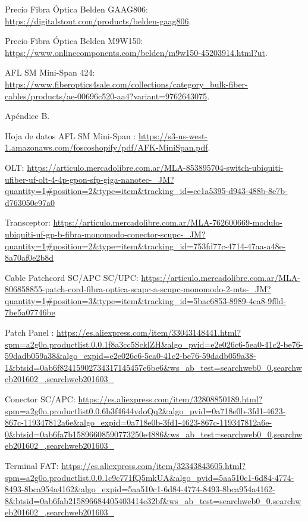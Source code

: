 \begin{thebibliography}{99}
 Precio Fibra Óptica Belden GAAG806: {\tiny \url{https://digitalstout.com/products/belden-gaag806}}.

 Precio Fibra Óptica Belden M9W150: {\tiny \url{https://www.onlinecomponents.com/belden/m9w150-45203914.html?ut}}.

 AFL SM Mini-Span 424: {\tiny \url{https://www.fiberoptics4sale.com/collections/category_bulk-fiber-cables/products/ae-00696c520-aa4?variant=9762643075}}.

 Apéndice B.

 Hoja de datos AFL SM Mini-Span : {\tiny \url{https://s3-us-west-1.amazonaws.com/foscoshopify/pdf/AFK-MiniSpan.pdf}}.

 OLT: {\tiny \url{https://articulo.mercadolibre.com.ar/MLA-853895704-switch-ubiquiti-ufiber-uf-olt-4-4p-gpon-sfp-giga-nanotec-_JM?quantity=1#position=2&type=item&tracking_id=ce1a5395-d943-488b-8e7b-d763050e97a0}}

 Transceptor: {\tiny \url{https://articulo.mercadolibre.com.ar/MLA-762600669-modulo-ubiquiti-uf-gp-b-fibra-monomodo-conector-scupc-_JM?quantity=1#position=2&type=item&tracking_id=753fd77c-4714-47aa-a48e-8a70af0e2b8d}}

 Cable Patchcord SC/APC SC/UPC: {\tiny \url{https://articulo.mercadolibre.com.ar/MLA-806858855-patch-cord-fibra-optica-scapc-a-scupc-monomodo-2-mts-_JM?quantity=1#position=3&type=item&tracking_id=5bac6853-8989-4ea8-9f0d-7be5a07746be}}

 Patch Panel : {\tiny \url{https://es.aliexpress.com/item/33043148441.html?spm=a2g0o.productlist.0.0.1f8a3cc5ScklZH&algo_pvid=e2e026c6-5ea0-41c2-be76-59dadb059a38&algo_expid=e2e026c6-5ea0-41c2-be76-59dadb059a38-1&btsid=0ab6f82415902734317145457e6be6&ws_ab_test=searchweb0_0,searchweb201602_,searchweb201603_}}

 Conector SC/APC: {\tiny \url{https://es.aliexpress.com/item/32808850189.html?spm=a2g0o.productlist0.0.6b3f4644vdoQq2&algo_pvid=0a718e0b-3fd1-4623-867c-119347812a6e&algo_expid=0a718e0b-3fd1-4623-867c-119347812a6e-0&btsid=0ab6fa7b15896608590773250e4886&ws_ab_test=searchweb0_0,searchweb201602_,searchweb201603_}}

 Terminal FAT: {\tiny \url{https://es.aliexpress.com/item/32343843605.html?spm=a2g0o.productlist.0.0.1c9c771fQ5mkUA&algo_pvid=5aa510c1-6d84-4774-8493-8bca954a4162&algo_expid=5aa510c1-6d84-4774-8493-8bca954a4162-8&btsid=0ab6fab215896684405403414e32bf&ws_ab_test=searchweb0_0,searchweb201602_,searchweb201603_}}



\end{thebibliography}
